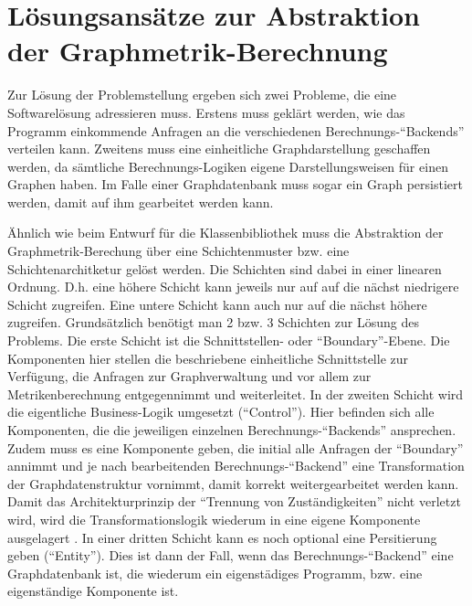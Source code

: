 \documentclass[a4paper,12pt,ngerman,chapterprefix=false,listof=totoc,bibliography=totoc]{scrreprt}
\begin{document}
{{\section{Lösungsansätze zur Abstraktion der Graphmetrik-Berechnung}
{
Zur Lösung der Problemstellung ergeben sich zwei Probleme, die eine Softwarelösung adressieren muss. Erstens muss geklärt werden, wie das Programm einkommende Anfragen an die verschiedenen Berechnungs-"`Backends"' verteilen kann. Zweitens muss eine einheitliche Graphdarstellung geschaffen werden, da sämtliche Berechnungs-Logiken eigene Darstellungsweisen für einen Graphen haben. Im Falle einer Graphdatenbank muss sogar ein Graph persistiert werden, damit auf ihm gearbeitet werden kann.

Ähnlich wie beim Entwurf für die Klassenbibliothek muss die Abstraktion der Graphmetrik-Berechung über eine Schichtenmuster bzw. eine Schichtenarchitketur gelöst werden. Die Schichten sind dabei in einer linearen Ordnung. D.h. eine höhere Schicht kann jeweils nur auf auf die nächst niedrigere Schicht zugreifen. \cite{balzert_lehrbuch_2011} Eine untere Schicht kann auch nur auf die nächst höhere zugreifen. Grundsätzlich benötigt man 2 bzw. 3 Schichten zur Lösung des Problems. Die erste Schicht ist die Schnittstellen- oder "`Boundary"'-Ebene. Die Komponenten hier stellen die beschriebene einheitliche Schnittstelle zur Verfügung, die Anfragen zur Graphverwaltung und vor allem zur Metrikenberechnung entgegennimmt und weiterleitet. In der zweiten Schicht wird die eigentliche Business-Logik umgesetzt ("`Control"'). Hier befinden sich alle Komponenten, die die jeweiligen einzelnen Berechnungs-"`Backends"' ansprechen. Zudem muss es eine Komponente geben, die initial alle Anfragen der "`Boundary"' annimmt und je nach bearbeitenden Berechnungs-"`Backend"' eine Transformation der Graphdatenstruktur vornimmt, damit korrekt weitergearbeitet werden kann. Damit das Architekturprinzip der "`Trennung von Zuständigkeiten"' nicht verletzt wird, wird die Transformationslogik wiederum in eine eigene Komponente ausgelagert \cite{balzert_lehrbuch_2011}. In einer dritten Schicht kann es noch optional eine Persitierung geben ("`Entity"'). Dies ist dann der Fall, wenn das Berechnungs-"`Backend"' eine Graphdatenbank ist, die wiederum ein eigenstädiges Programm, bzw. eine eigenständige Komponente ist.

}}}
\end{document}
